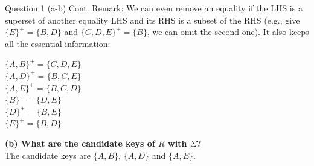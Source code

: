 \begin{frame}[fragile]{Question 1 (a-b) Cont.}
	Remark: We can even remove an equality if the LHS is a superset of another equality LHS and its RHS is a subset of the RHS (e.g., give $\{E\}^{+}= \{B, D\}$ and $\{C, D, E\}^{+}= \{B\}$, we can omit the second one). It also keeps all the essential information:\\\vspace{6pt}

	$\{A, B\}^{+}= \{C, D, E\}$\\
		$\{A, D\}^{+}= \{B, C, E\}$\\
		$\{A, E\}^{+}= \{B, C, D\}$\\
		$\{B\}^{+}= \{D, E\}$\\
		$\{D\}^{+}= \{B, E\}$\\
		$\{E\}^{+}= \{B, D\}$\\ \vspace{7pt}
	
	\textbf{(b) What are the candidate keys of $R$ with $\Sigma$?}\\ \vspace{3pt}
	The candidate keys are $\{A,B\}$, $\{A,D\}$ and $\{A,E\}$.\\
\end{frame}

